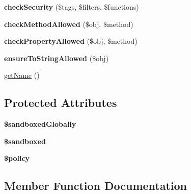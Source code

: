 \begin{DoxyCompactItemize}
\item 
{\bfseries check\+Security} (\$tags, \$filters, \$functions)\hypertarget{classTwig__Extension__Sandbox_a5db088ed677a35e5197abe1b804521eb}{}\label{classTwig__Extension__Sandbox_a5db088ed677a35e5197abe1b804521eb}

\item 
{\bfseries check\+Method\+Allowed} (\$obj, \$method)\hypertarget{classTwig__Extension__Sandbox_a4e914fd8ba695a60db8eb0b8a69f9366}{}\label{classTwig__Extension__Sandbox_a4e914fd8ba695a60db8eb0b8a69f9366}

\item 
{\bfseries check\+Property\+Allowed} (\$obj, \$method)\hypertarget{classTwig__Extension__Sandbox_a11e6526d07f2672a8eb910a89e660f01}{}\label{classTwig__Extension__Sandbox_a11e6526d07f2672a8eb910a89e660f01}

\item 
{\bfseries ensure\+To\+String\+Allowed} (\$obj)\hypertarget{classTwig__Extension__Sandbox_a5c2ad5531dd46b5b35cc5a8b4753501d}{}\label{classTwig__Extension__Sandbox_a5c2ad5531dd46b5b35cc5a8b4753501d}

\item 
\hyperlink{classTwig__Extension__Sandbox_afeacb956da2ad6ddd43f97a6dd2ad692}{get\+Name} ()
\end{DoxyCompactItemize}
\subsection*{Protected Attributes}
\begin{DoxyCompactItemize}
\item 
{\bfseries \$sandboxed\+Globally}\hypertarget{classTwig__Extension__Sandbox_a00250a3cc98e7db9186e85c0a11268e4}{}\label{classTwig__Extension__Sandbox_a00250a3cc98e7db9186e85c0a11268e4}

\item 
{\bfseries \$sandboxed}\hypertarget{classTwig__Extension__Sandbox_a2a59d31d5cd9b5fabdc29954d6e286dd}{}\label{classTwig__Extension__Sandbox_a2a59d31d5cd9b5fabdc29954d6e286dd}

\item 
{\bfseries \$policy}\hypertarget{classTwig__Extension__Sandbox_aca5da3cbc16bdbdab4a666e762e601a1}{}\label{classTwig__Extension__Sandbox_aca5da3cbc16bdbdab4a666e762e601a1}

\end{DoxyCompactItemize}


\subsection{Member Function Documentation}
